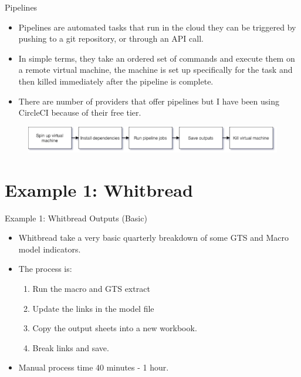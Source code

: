 \documentclass[aspectratio=169]{beamer}
\begin{document}
\begin{frame}{Pipelines}

\begin{itemize}
	\item Pipelines are automated tasks that run in the cloud they can be triggered by pushing to a git repository, or through an API call.
	\item In simple terms, they take an ordered set of commands and execute them on a remote virtual machine, the machine is set up specifically for the task and then killed immediately after the pipeline is complete.
	\item There are number of providers that offer pipelines but I have been using CircleCI because of their free tier. 
\end{itemize}

\begin{figure}
\centering
\includegraphics[scale=0.6]{graphics/pipeline-process.png}	
\end{figure}


\end{frame}

\section{Example 1: Whitbread}

\begin{frame}{Example 1: Whitbread Outputs (Basic)}

\begin{itemize}
	\item Whitbread take a very basic quarterly breakdown of some GTS and Macro model indicators.
	\item The process is:
	\begin{enumerate}
		\item Run the macro and GTS extract
		\item Update the links in the model file
		\item Copy the output sheets into a new workbook. 
		\item Break links and save.
	\end{enumerate}
	\item Manual process time 40 minutes - 1 hour.
\end{itemize}
\end{frame}
\end{document}
